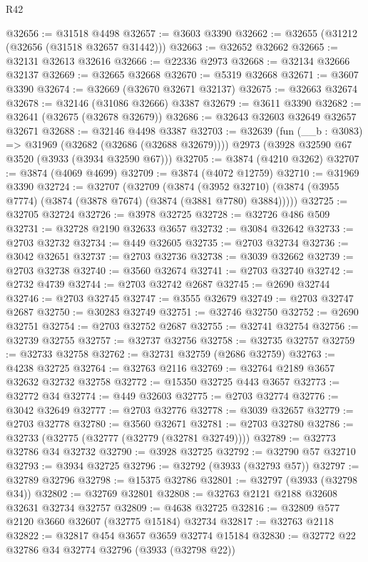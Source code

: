 \begin{lexlean}{R42}
\begin{coremodule}
@32656 := @31518 @4498
@32657 := @3603 @3390
@32662 := @32655 (@31212 (@32656 (@31518 @32657 @31442)))
@32663 := @32652 @32662
@32665 := @32131 @32613 @32616
@32666 := @22336 @2973
@32668 := @32134 @32666 @32137
@32669 := @32665 @32668
@32670 := @5319 @32668
@32671 := @3607 @3390
@32674 := @32669 (@32670 @32671 @32137)
@32675 := @32663 @32674
@32678 := @32146 (@31086 @32666) @3387
@32679 := @3611 @3390
@32682 := @32641 (@32675 (@32678 @32679))
@32686 := @32643 @32603 @32649 @32657 @32671
@32688 := @32146 @4498 @3387
@32703 := @32639
    (fun (__b : @3083) => @31969 (@32682 (@32686 (@32688 @32679))))
    @2973
    (@3928 @32590 @67 @3520 (@3933 (@3934 @32590 @67)))
@32705 := @3874 (@4210 @3262)
@32707 := @3874 (@4069 @4699)
@32709 := @3874 (@4072 @12759)
@32710 := @31969 @3390
@32724 := @32707
    (@32709
      (@3874
        (@3952 @32710)
        (@3874 (@3955 @7774) (@3874 (@3878 @7674) (@3874 (@3881 @7780) @3884)))))
@32725 := @32705 @32724
@32726 := @3978 @32725
@32728 := @32726 @486 @509
@32731 := @32728 @2190 @32633 @3657
@32732 := @3084 @32642
@32733 := @2703 @32732
@32734 := @449 @32605
@32735 := @2703 @32734
@32736 := @3042 @32651
@32737 := @2703 @32736
@32738 := @3039 @32662
@32739 := @2703 @32738
@32740 := @3560 @32674
@32741 := @2703 @32740
@32742 := @2732 @4739
@32744 := @2703 @32742 @2687
@32745 := @2690 @32744
@32746 := @2703 @32745
@32747 := @3555 @32679
@32749 := @2703 @32747 @2687
@32750 := @30283 @32749
@32751 := @32746 @32750
@32752 := @2690 @32751
@32754 := @2703 @32752 @2687
@32755 := @32741 @32754
@32756 := @32739 @32755
@32757 := @32737 @32756
@32758 := @32735 @32757
@32759 := @32733 @32758
@32762 := @32731 @32759 (@2686 @32759)
@32763 := @4238 @32725
@32764 := @32763 @2116
@32769 := @32764 @2189 @3657 @32632 @32732 @32758
@32772 := @15350 @32725 @443 @3657
@32773 := @32772 @34
@32774 := @449 @32603
@32775 := @2703 @32774
@32776 := @3042 @32649
@32777 := @2703 @32776
@32778 := @3039 @32657
@32779 := @2703 @32778
@32780 := @3560 @32671
@32781 := @2703 @32780
@32786 := @32733 (@32775 (@32777 (@32779 (@32781 @32749))))
@32789 := @32773 @32786 @34 @32732
@32790 := @3928 @32725
@32792 := @32790 @57 @32710
@32793 := @3934 @32725
@32796 := @32792 (@3933 (@32793 @57))
@32797 := @32789 @32796
@32798 := @15375 @32786
@32801 := @32797 (@3933 (@32798 @34))
@32802 := @32769 @32801
@32808 := @32763 @2121 @2188 @32608 @32631 @32734 @32757
@32809 := @4638 @32725
@32816 := @32809 @577 @2120 @3660 @32607 (@32775 @15184) @32734
@32817 := @32763 @2118
@32822 := @32817 @454 @3657 @3659 @32774 @15184
@32830 := @32772 @22 @32786 @34 @32774 @32796 (@3933 (@32798 @22))

\end{coremodule}
\end{lexlean}
